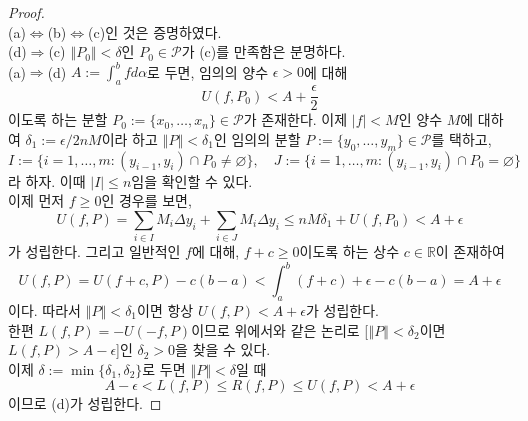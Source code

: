 \documentclass[11pt]{book}
\numberwithin{equation}{chapter}
\def\RR{\mathbb{R}}
\def\eps{\epsilon}
\def\calP{\mathcal{P}}
\newcommand{\abs}[1]{\left\vert#1\right\vert}
\newcommand{\norm}[1]{\left\Vert#1\right\Vert}
\theoremstyle{definition}
\begin{document}
\begin{proof}
    \quad\\
    (a)\(\Leftrightarrow\)(b)\(\Leftrightarrow\)(c)인 것은 증명하였다.\\
    (d)\(\Rightarrow\)(c) \(\norm{P_0} < \delta\)인 \(P_0 \in \calP\)가 (c)를 만족함은 분명하다.\\
    (a)\(\Rightarrow\)(d) \(\displaystyle A := \int_a^b f d\alpha\)로 두면, 임의의 양수 \(\eps > 0\)에 대해
    \[
        U(f, P_0) < A + \frac{\eps}{2}
    \]
    이도록 하는 분할 \(P_0 := \{x_0, \ldots, x_n\} \in \calP\)가 존재한다. 이제 \(\abs{f} < M\)인 양수 \(M\)에 대하여 \(\delta_1 := \eps / 2nM\)이라 하고 \(\norm{P} < \delta_1\)인 임의의 분할 \(P := \{y_0, \ldots, y_m\} \in \calP\)를 택하고,
    \[
        I := \{i = 1, \ldots, m : (y_{i-1}, y_i) \cap P_0 \ne \varnothing\}, \quad J := \{i = 1, \ldots, m : (y_{i-1}, y_i) \cap P_0 = \varnothing\}
    \]
    라 하자. 이때 \(\abs{I} \le n\)임을 확인할 수 있다.\\
    이제 먼저 \(f \ge 0\)인 경우를 보면,
    \[
        U(f, P) = \sum_{i \in I} M_i \Delta y_i + \sum_{i \in J} M_i \Delta y_i \le nM\delta_1 + U(f, P_0) < A + \eps
    \]
    가 성립한다. 그리고 일반적인 \(f\)에 대해, \(f + c \ge 0\)이도록 하는 상수 \(c \in \RR\)이 존재하여
    \[
        U(f, P) = U(f+c, P) - c(b-a) < \int_a^b (f+c) + \eps - c(b-a) = A + \eps
    \]
    이다. 따라서 \(\norm{P} < \delta_1\)이면 항상 \(U(f, P) < A + \eps\)가 성립한다.\\
    한편 \(L(f, P) = -U(-f, P)\)이므로 위에서와 같은 논리로 [\(\norm{P} < \delta_2\)이면 \(L(f, P) > A - \eps\)]인 \(\delta_2 > 0\)을 찾을 수 있다.\\
    이제 \(\delta := \min \{\delta_1, \delta_2\}\)로 두면 \(\norm{P} < \delta\)일 때
    \[
        A - \eps < L(f, P) \le R(f, P) \le U(f, P) < A + \eps
    \]
    이므로 (d)가 성립한다.
\end{proof}
\end{document}
